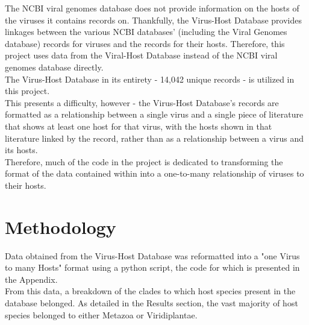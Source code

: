 \documentclass[12pt]{article}
\begin{document}
    The NCBI viral genomes database does not provide information on the hosts
    of the viruses it contains records on. Thankfully, the Virus-Host Database provides
    linkages between the various NCBI databases' (including the Viral Genomes
    database) records for viruses and the records for their hosts. Therefore,
    this project uses data from the Viral-Host Database instead of the NCBI viral
    genomes database directly. \\
    The Virus-Host Database in its entirety - 14,042 unique records - is utilized in
    this project. \\
    This presents a difficulty, however - the Virus-Host Database's records are formatted
    as a relationship between a single virus and a single piece of literature
    that shows at least one host for that virus, with the hosts shown in that
    literature linked by the record, rather than as a relationship between a
    virus and its hosts. \\
    Therefore, much of the code in the project is dedicated to transforming
    the format of the data contained within into a one-to-many relationship
    of viruses to their hosts.

    \section{Methodology}
    
    Data obtained from the Virus-Host Database was reformatted into a "one Virus
    to many Hosts" format using a python script, the code for which is presented
    in the Appendix. \\
    From this data, a breakdown of the clades to which host species present in the
    database belonged. As detailed in the Results section, the vast majority of
    host species belonged to either Metazoa or Viridiplantae.
\end{document}
